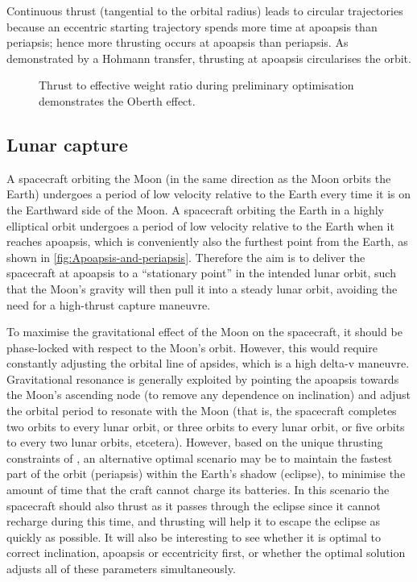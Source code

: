 Continuous thrust (tangential to the orbital radius) leads to circular trajectories because an eccentric starting trajectory spends more time at apoapsis than periapsis; hence more thrusting occurs at apoapsis than periapsis. As demonstrated by a Hohmann transfer, thrusting at apoapsis circularises the orbit.

\begin{figure}
\caption{Thrust to effective weight ratio during preliminary optimisation demonstrates the Oberth effect.}
\label{fig:BW1-T/W-ratio}
\centering
\def\svgwidth{\figurewidth}

\end{figure}

\subsection{Lunar capture} \label{sub:Capture}

A spacecraft orbiting the Moon (in the same direction as the Moon orbits the Earth) undergoes a period of low velocity relative to the Earth every time it is on the Earthward side of the Moon. A spacecraft orbiting the Earth in a highly elliptical orbit undergoes a period of low velocity relative to the Earth when it reaches apoapsis, which is conveniently also the furthest point from the Earth, as shown in \autoref{fig:Apoapsis-and-periapsis}. Therefore the aim is to deliver the spacecraft at apoapsis to a \enquote{stationary point} in the intended lunar orbit, such that the Moon's gravity will then pull it into a steady lunar orbit, avoiding the need for a high-thrust capture maneuvre.

To maximise the gravitational effect of the Moon on the spacecraft, it should be phase-locked with respect to the Moon's orbit. However, this would require constantly adjusting the orbital line of apsides, which is a high delta-v maneuvre. Gravitational resonance is generally exploited by pointing the apoapsis towards the Moon's ascending node (to remove any dependence on inclination) and adjust the orbital period to resonate with the Moon (that is, the spacecraft completes two orbits to every lunar orbit, or three orbits to every lunar orbit, or five orbits to every two lunar orbits, etcetera). However, based on the unique thrusting constraints of \BW, an alternative optimal scenario may be to maintain the fastest part of the orbit (periapsis) within the Earth's shadow (eclipse), to minimise the amount of time that the craft cannot charge its batteries. In this scenario the spacecraft should also thrust as it passes through the eclipse since it cannot recharge during this time, and thrusting will help it to escape the eclipse as quickly as possible. It will also be interesting to see whether it is optimal to correct inclination, apoapsis or eccentricity first, or whether the optimal solution adjusts all of these parameters simultaneously.
 

